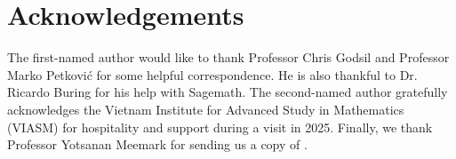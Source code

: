 \documentclass[12pt, a4paper]{amsart}
\theoremstyle{definition}
\numberwithin{equation}{section}
\begin{document}
\section*{\textbf{Acknowledgements}}
The first-named author would like to thank Professor Chris Godsil and Professor Marko Petkovi\'c for some helpful correspondence. He is also thankful to Dr. Ricardo Buring for his help with Sagemath.  The second-named author gratefully acknowledges the Vietnam Institute for Advanced Study in Mathematics (VIASM) for hospitality and support during a visit in 2025. Finally, we thank Professor Yotsanan Meemark for sending us a copy of \cite{pst-gcd-new}. 


\providecommand{\bysame}{\leavevmode\hbox to3em{\hrulefill}\thinspace}
\providecommand{\MR}{\relax\ifhmode\unskip\space\fi MR }
\providecommand{\MRhref}[2]{%
  \href{http://www.ams.org/mathscinet-getitem?mr=#1}{#2}
}
\end{document}
